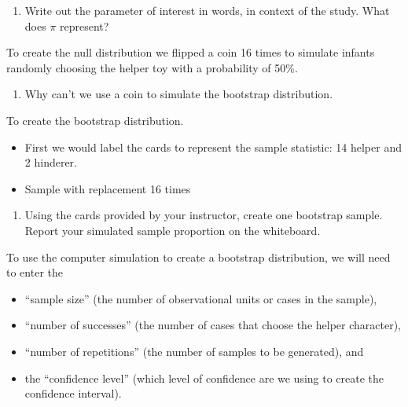 \documentclass[
]{report}
\providecommand{\tightlist}{%
  \setlength{\itemsep}{0pt}\setlength{\parskip}{0pt}}
\begin{document}
\begin{enumerate}
\def\labelenumi{\arabic{enumi}.}
\setcounter{enumi}{2}
\tightlist
\item
  Write out the parameter of interest in words, in context of the study. What does \(\pi\) represent?
\end{enumerate}

\vspace{0.5in}

To create the null distribution we flipped a coin 16 times to simulate infants randomly choosing the helper toy with a probability of 50\%.

\begin{enumerate}
\def\labelenumi{\arabic{enumi}.}
\setcounter{enumi}{3}
\tightlist
\item
  Why can't we use a coin to simulate the bootstrap distribution.
\end{enumerate}

\vspace{0.7in}

To create the bootstrap distribution.

\begin{itemize}
\item
  First we would label the cards to represent the sample statistic: 14 helper and 2 hinderer.
\item
  Sample with replacement 16 times
\end{itemize}

\begin{enumerate}
\def\labelenumi{\arabic{enumi}.}
\setcounter{enumi}{4}
\tightlist
\item
  Using the cards provided by your instructor, create one bootstrap sample. Report your simulated sample proportion on the whiteboard.
\end{enumerate}

\vspace{0.3in}

To use the computer simulation to create a bootstrap distribution, we will need to enter the

\begin{itemize}
\tightlist
\item
  ``sample size'' (the number of observational units or cases in the sample),
\item
  ``number of successes'' (the number of cases that choose the helper character),
\item
  ``number of repetitions'' (the number of samples to be generated), and
\item
  the ``confidence level'' (which level of confidence are we using to create the confidence interval).
\end{itemize}
\end{document}

